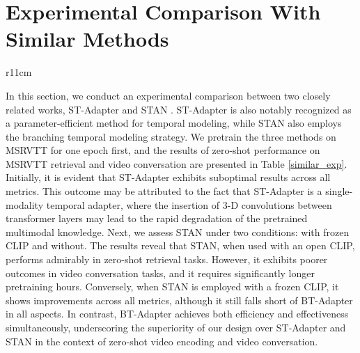 \documentclass{article} \usepackage{iclr2024_conference,times}
\begin{document}
\section{Experimental Comparison With Similar Methods} \label{similar_sec}

\begin{wraptable}{r}{11cm}
\setlength{\tabcolsep}{3pt}
\begin{center}
    \vspace{-1em}
      \caption{\small The experimental comparison with closely related works.} 
      \vspace{-1em}
      \renewcommand\tabcolsep{9pt}
    \end{center}
    \vspace{-1.5em}
\end{wraptable}

In this section, we conduct an experimental comparison between two closely related works, ST-Adapter \citep{pan2022st} and STAN \citep{liu2023revisiting}. ST-Adapter is also notably recognized as a parameter-efficient method for temporal modeling, while STAN also employs the branching temporal modeling strategy. We pretrain the three methods on MSRVTT for one epoch first, and the results of zero-shot performance on MSRVTT retrieval and video conversation are presented in Table \ref{similar_exp}. Initially, it is evident that ST-Adapter exhibits suboptimal results across all metrics. This outcome may be attributed to the fact that ST-Adapter is a single-modality temporal adapter, where the insertion of 3-D convolutions between transformer layers may lead to the rapid degradation of the pretrained multimodal knowledge. Next, we assess STAN under two conditions: with frozen CLIP and without. The results reveal that STAN, when used with an open CLIP, performs admirably in zero-shot retrieval tasks. However, it exhibits poorer outcomes in video conversation tasks, and it requires significantly longer pretraining hours. Conversely, when STAN is employed with a frozen CLIP, it shows improvements across all metrics, although it still falls short of BT-Adapter in all aspects. In contrast, BT-Adapter achieves both efficiency and effectiveness simultaneously, underscoring the superiority of our design over ST-Adapter and STAN in the context of zero-shot video encoding and video conversation.
\end{document}
